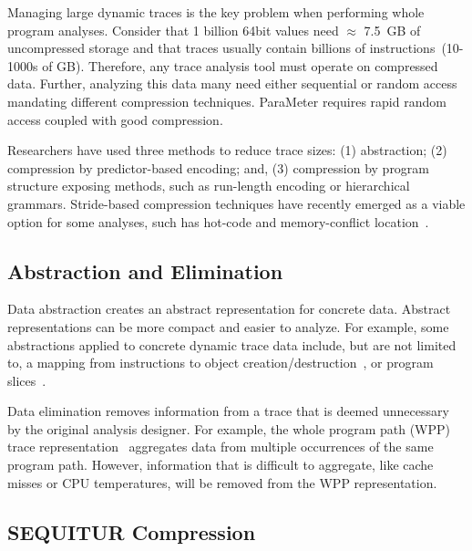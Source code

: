 \documentclass[defaultstyle,11pt]{thesis}
\begin{document}
Managing large dynamic traces is the key problem when performing whole
program analyses. Consider that 1 billion 64bit values need $\approx$
7.5~GB of uncompressed storage and that traces usually contain
billions of instructions~(10-1000s of GB). Therefore, any trace
analysis tool must operate on compressed data. Further, analyzing this
data many need either sequential or random access mandating
different compression techniques. ParaMeter requires rapid random
access coupled with good compression.

Researchers have used three methods to reduce trace sizes: (1)
abstraction; (2) compression by predictor-based encoding; and, (3)
compression by program structure exposing methods, such as run-length
encoding or hierarchical grammars.  Stride-based compression
techniques have recently emerged as a viable option for some analyses,
such has hot-code and memory-conflict
location~\cite{minjang:10:micro}.

\subsection{Abstraction and Elimination}

Data abstraction creates an abstract representation for concrete data.
Abstract representations can be more compact and easier to analyze.
For example, some abstractions applied to concrete dynamic trace data
include, but are not limited to, a mapping from instructions to object
creation/destruction~\cite{sridharan:07:pldi}, or program
slices~\cite{zhang:04:icse}.

Data elimination removes information from a trace that is deemed
unnecessary by the original analysis designer.  For example, the whole
program path (WPP) trace representation~\cite{larus:99:pldi}
aggregates data from multiple occurrences of the same program
path.  However, information that is difficult to aggregate, like cache
misses or CPU temperatures, will be removed from the WPP
representation.

\subsection{SEQUITUR Compression}
\end{document}

